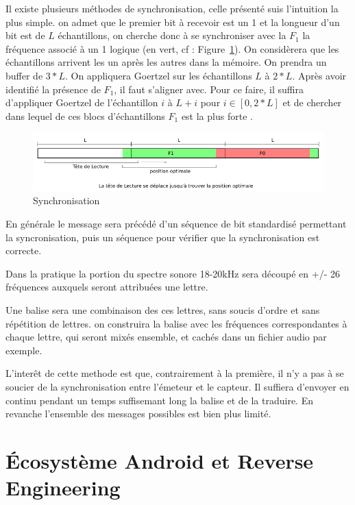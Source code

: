 \documentclass[12pt]{article}
\begin{document}
Il existe plusieurs méthodes de synchronisation, celle présenté suis l'intuition la plus simple. on admet que le premier bit à recevoir est un 1 et la longueur d'un bit est de $L$ échantillons, on cherche donc à se synchroniser avec la $F_1$ la fréquence associé à un 1 logique (en vert, cf : Figure~\ref{fig:syncro}).
On considèrera que les échantillons arrivent les un après les autres dans la mémoire. On prendra un buffer de $3*L$. On appliquera Goertzel sur les échantillons $L$ à $2*L$. Après avoir identifié la présence de $F_1$, il faut s'aligner avec. Pour ce faire, il suffira d'appliquer Goertzel de l'échantillon $i$ à $L+i$ pour $i \in [0,2*L]$ et de chercher dans lequel de ces blocs d'échantillons $F_1$ est la plus forte .

\begin{figure}[H]
\begin{center}
\caption{Synchronisation}
\label{fig:syncro}
\includegraphics[scale=0.8]{syncro.png}
\end{center}
\end{figure}

En générale le message sera précédé d'un séquence de bit standardisé permettant la syncronisation, puis un séquence pour vérifier que la synchronisation est correcte.

Dans la pratique la portion du spectre sonore 18-20kHz sera découpé en +/- 26 fréquences auxquels seront attribuées une lettre.

Une balise sera une combinaison des ces lettres, sans soucis d'ordre et sans répétition de lettres. on construira la balise avec les fréquences correspondantes à chaque lettre, qui seront mixés ensemble, et cachés dans un fichier audio par exemple.

L'interêt de cette methode est que, contrairement à la première, il n'y a pas à se soucier de la synchronisation entre l'émeteur et le capteur. Il suffiera d'envoyer en continu pendant un temps suffisemant long la balise et de la traduire. En revanche l'ensemble des messages possibles est bien plus limité.

\section{Écosystème Android et Reverse Engineering}
\end{document}
